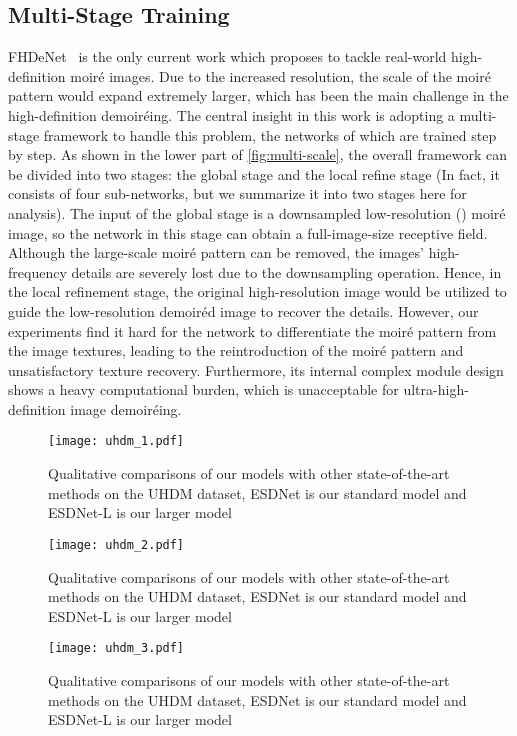 \documentclass[runningheads]{llncs}
\begin{document}
\subsection{Multi-Stage Training}
FHDeNet~\cite{he2020fhde} is the only current work which proposes to tackle real-world high-definition moiré images. Due to the increased resolution, the scale of the moiré pattern would expand extremely larger, which has been the main challenge in the high-definition demoiréing. The central insight in this work is adopting a multi-stage framework to handle this problem, the networks of which are trained step by step. As shown in the lower part of \cref{fig:multi-scale}, the overall framework can be divided into two stages: the global stage and the local refine stage (In fact, it consists of four sub-networks, but we summarize it into two stages here for analysis). The input of the global stage is a downsampled low-resolution () moiré image, so the network in this stage can obtain a full-image-size receptive field. Although the large-scale moiré pattern can be removed, the images' high-frequency details are severely lost due to the downsampling operation. Hence, in the local refinement stage, the original high-resolution image would be utilized to guide the low-resolution demoiréd image to recover the details. However, our experiments find it hard for the network to differentiate the moiré pattern from the image textures, leading to the reintroduction of the moiré pattern and unsatisfactory texture recovery. Furthermore, its internal complex module design shows a heavy computational burden, which is unacceptable for ultra-high-definition image demoiréing.

\begin{figure*}
  \centering
    \texttt{[image: uhdm\_1.pdf]}
    \caption{Qualitative comparisons of our models with other state-of-the-art methods on the UHDM dataset, ESDNet is our standard model and ESDNet-L is our larger model}
    \label{fig:uhdm_1}
\end{figure*}

\begin{figure*}
  \centering
    \texttt{[image: uhdm\_2.pdf]}
    \caption{Qualitative comparisons of our models with other state-of-the-art methods on the UHDM dataset, ESDNet is our standard model and ESDNet-L is our larger model}
    \label{fig:uhdm_2}
\end{figure*}

\begin{figure*}
  \centering
    \texttt{[image: uhdm\_3.pdf]}
    \caption{Qualitative comparisons of our models with other state-of-the-art methods on the UHDM dataset, ESDNet is our standard model and ESDNet-L is our larger model}
    \label{fig:uhdm_3}
\end{figure*}
\end{document}
